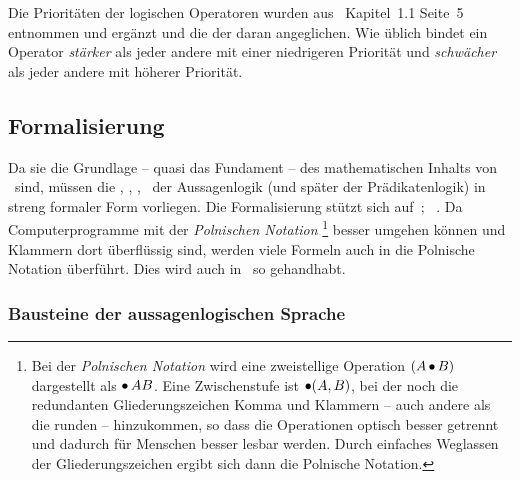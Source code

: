 Die Prioritäten der logischen Operatoren wurden aus~\cite{bib:Rautenberg} Kapitel~1.1 Seite~5 entnommen und ergänzt und die der  daran angeglichen.
Wie üblich bindet ein Operator \emph{stärker} als jeder andere mit einer niedrigeren Priorität und \emph{schwächer} als jeder andere mit höherer Priorität.

\subsection{Formalisierung}%
\label{sub:Formalisierung}

Da sie die Grundlage -- quasi das Fundament -- des mathematischen Inhalts von \ASBA\ sind, müssen die , , , \textusw\ der Aussagenlogik (und später der Prädikatenlogik) in streng formaler Form vorliegen.
Die Formalisierung stützt sich auf~\cite{bib:Aussagenlogik}; \alsoname~\cite{bib:LogikDe, bib:LogikEn}.
Da Computerprogramme mit der \emph{Polnischen Notation}%
\footnote{%
	Bei der \emph{Polnischen Notation} wird eine zweistellige Operation $(A\operatorname{\bullet} B)$ dargestellt als $\operatorname{\bullet} A B$.
	Eine Zwischenstufe ist $\operatorname{\bullet}(A,B)$, bei der noch die redundanten Gliederungszeichen Komma und Klammern -- auch andere als die runden -- hinzukommen, so dass die Operationen optisch besser getrennt und dadurch für Menschen besser lesbar werden.
	Durch einfaches Weglassen der Gliederungszeichen ergibt sich dann die Polnische Notation.%
}
besser umgehen können und Klammern dort überflüssig sind, werden viele Formeln auch in die Polnische Notation überführt. Dies wird auch in \ASBA\ so gehandhabt.

\subsubsection{Bausteine der aussagenlogischen Sprache}%
\label{subsub:Bausteine}

